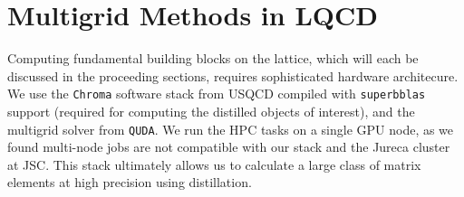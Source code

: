 \section{Multigrid Methods in LQCD}
Computing fundamental building blocks on the lattice, which will each be discussed in the proceeding sections, requires sophisticated hardware architecure. We use the \verb|Chroma| software stack from USQCD \cite{Edwards_2005} compiled with \verb|superbblas| support (required for computing the distilled objects of interest), and the multigrid solver from \verb|QUDA|. We run the HPC tasks on a single GPU node, as we found multi-node jobs are not compatible with our stack and the Jureca cluster at JSC. This stack ultimately allows us to calculate a large class of matrix elements at high precision \cite{romero_efficient_2020} using distillation. 

